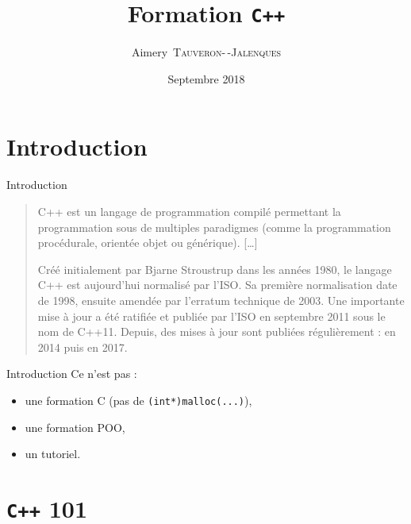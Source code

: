 \documentclass{beamer}
\title{Formation \texttt{C++}}
\date{Septembre 2018}
\author[A.~\textsc{Tauveron}]{Aimery~\textsc{Tauveron-\,-Jalenques}}
\institute{\href{https://viarezo.fr/}{ViaRézo}}
\numberwithin{equation}{section}
\begin{document}
\lstset{breaklines=true, showstringspaces=false}
\lstset{language=[11]C++}

\frame{\titlepage}


\section*{Introduction}
\label{sec:introduction}
\begin{frame}{Introduction}
  \begin{quotation}
    C++ est un langage de programmation compilé permettant la programmation sous de multiples paradigmes (comme la programmation procédurale, orientée objet ou générique). [\dots{}]

    Créé initialement par Bjarne Stroustrup dans les années 1980, le langage C++ est aujourd'hui normalisé par l'ISO. Sa première normalisation date de 1998, ensuite amendée par l'erratum technique de 2003. Une importante mise à jour a été ratifiée et publiée par l'ISO en septembre 2011 sous le nom de C++11. Depuis, des mises à jour sont publiées régulièrement : en 2014 puis en 2017.
  \end{quotation}

\end{frame}

\begin{frame}{Introduction}
  Ce n'est pas :
  \begin{itemize}
    \item une formation C (pas de \texttt{(int*)malloc(...)}),
    \item une formation POO,
    \item un tutoriel.
  \end{itemize}
\end{frame}


\frame{\tableofcontents}


\section{\texttt{C++} 101}
\label{sec:cpp101}

\end{document}
